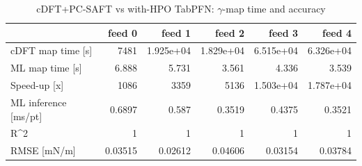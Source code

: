 \begin{table}
\caption{cDFT+PC-SAFT vs with-HPO TabPFN: $\gamma$-map time and accuracy}
\label{tab:cdft_vs_ml}
\begin{tabular}{lrrrrr}
\toprule
 & feed 0 & feed 1 & feed 2 & feed 3 & feed 4 \\
\midrule
cDFT map time [s] & 7481 & 1.925e+04 & 1.829e+04 & 6.515e+04 & 6.326e+04 \\
ML map time [s] & 6.888 & 5.731 & 3.561 & 4.336 & 3.539 \\
Speed-up [x] & 1086 & 3359 & 5136 & 1.503e+04 & 1.787e+04 \\
ML inference [ms/pt] & 0.6897 & 0.587 & 0.3519 & 0.4375 & 0.3521 \\
R^2 & 1 & 1 & 1 & 1 & 1 \\
RMSE [mN/m] & 0.03515 & 0.02612 & 0.04606 & 0.03154 & 0.03784 \\
\bottomrule
\end{tabular}
\end{table}
